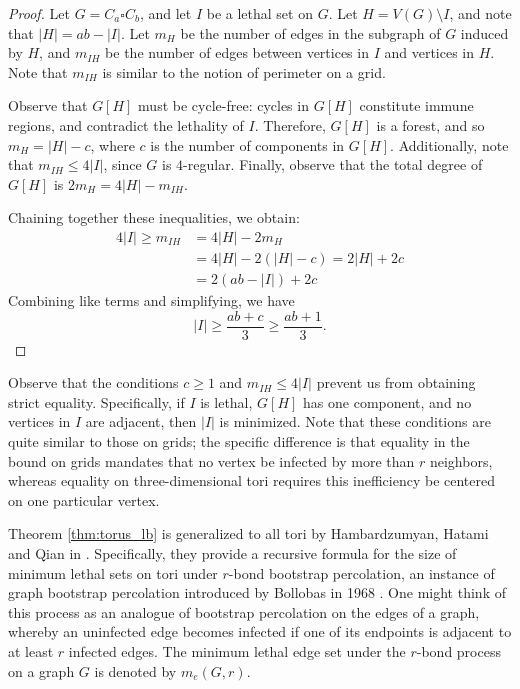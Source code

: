 \begin{proof}
Let $G = C_a \square C_b$, and let $I$ be a lethal set on $G$. Let $H = V(G) \setminus I$, and note that $|H| = ab - |I|$. Let $m_{H}$ be the number of edges in the subgraph of $G$ induced by $H$, and $m_{IH}$ be the number of edges between vertices in $I$ and vertices in $H$. Note that $m_{IH}$ is similar to the notion of perimeter on a grid.

Observe that $G[H]$ must be cycle-free: cycles in $G[H]$ constitute immune regions, and contradict the lethality of $I$. Therefore, $G[H]$ is a forest, and so $m_H = |H| - c$, where $c$ is the number of components in $G[H]$. Additionally, note that $m_{IH} \leq 4|I|$, since $G$ is $4$-regular. Finally, observe that the total degree of $G[H]$ is $2m_H = 4|H| - m_{IH}$.

Chaining together these inequalities, we obtain:
\begin{align*}
4|I| \geq m_{IH} &= 4|H| - 2m_H \\
&= 4|H| - 2(|H| -c) = 2|H| + 2c \\
&= 2(ab-|I|) + 2c
\end{align*}
Combining like terms and simplifying, we have
$$|I| \geq \frac{ab +c}{3} \geq \frac{ab +1}{3}.$$
\end{proof}

Observe that the conditions $c \geq 1$ and $m_{IH} \leq 4|I|$ prevent us from obtaining strict equality. Specifically, if $I$ is lethal, $G[H]$ has one component, and no vertices in $I$ are adjacent, then $|I|$ is minimized. Note that these conditions are quite similar to those on grids; the specific difference is that equality in the bound on grids mandates that no vertex be infected by more than $r$ neighbors, whereas equality on three-dimensional tori requires this inefficiency be centered on one particular vertex. 

Theorem \ref{thm:torus_lb} is generalized to all tori by Hambardzumyan, Hatami and Qian in \cite{hambardzumyan:2020}. Specifically, they provide a recursive formula for the size of minimum lethal sets on tori under $r$-bond bootstrap percolation, an instance of graph bootstrap percolation introduced by Bollobas in 1968 \cite{bollobas1968weakly}. One might think of this process as an analogue of bootstrap percolation on the edges of a graph, whereby an uninfected edge becomes infected if one of its endpoints is adjacent to at least $r$ infected edges. The minimum lethal edge set under the $r$-bond process on a graph $G$ is denoted by $m_e(G,r)$. 

